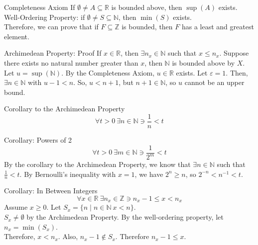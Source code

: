 \documentclass[8pt]{extarticle}
\newcommand{\N}{\mathbb{N}}
\newcommand{\Z}{\mathbb{Z}}
\newcommand{\R}{\mathbb{R}}
\begin{document}
  \begin{problem}{Completeness Axiom}
    If $\emptyset\neq A\subseteq \R$ is bounded above, then $\sup(A)$ exists.\\

    Well-Ordering Property: if $\emptyset \neq S\subseteq \N$, then $\min(S)$ exists.\\

    Therefore, we can prove that if $F\subseteq \Z$ is bounded, then $F$ has a least and greatest element.\\

    \begin{problem}{Archimedean Property: Proof}
      If $x\in\R$, then $\exists n_x\in\N$ such that $x\leq n_x$.
      \tcblower
      Suppose there exists no natural number greater than $x$, then $\N$ is bounded above by $X$. Let $u = \sup(\N)$. By the Completeness Axiom, $u\in\R$ exists. Let $\varepsilon = 1$. Then, $\exists n\in\N$ with $u-1 < n$. So, $u < n+1$, but $n+1\in\N$, so $u$ cannot be an upper bound.
    \end{problem}
    \begin{problem}{Corollary to the Archimedean Property}
      \[
        \forall t > 0~\exists n\in\N \ni \frac{1}{n}<t
      \] 
    \end{problem}
    \begin{problem}{Corollary: Powers of 2}
      \[
        \forall t > 0~\exists m\in\N \ni \frac{1}{2^m} < t
      \] 
      \tcblower
      By the corollary to the Archimedean Property, we know that $\exists n\in \N$ such that $\frac{1}{n} < t$. By Bernoulli's inequality with $x = 1$, we have $2^n \geq n$, so $2^{-n} < n^{-1} < t$.
    \end{problem}
    \begin{problem}{Corollary: In Between Integers}
      \[
        \forall x\in\R~\exists n_x\in \Z \ni n_x-1 \leq x < n_x
      \] 
      \tcblower
      Assume $x \geq 0$. Let $S_x = \{n\mid n\in \N~x < n\}$.\\

      $S_x \neq \emptyset$ by the Archimedean Property. By the well-ordering property, let $n_x = \min(S_x)$.\\

      Therefore, $x < n_x$. Also, $n_x - 1 \notin S_x$. Therefore $n_x - 1 \leq x$.
    \end{problem}
  \end{problem}
\end{document}
